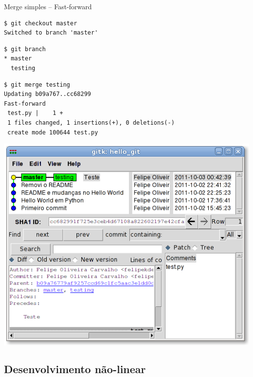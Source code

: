 \documentclass[portuguese,brazil]{beamer}
\begin{document}
\begin{frame}[fragile]{Merge simples -- Fast-forward}
\begin{verbatim}
$ git checkout master
Switched to branch 'master'
\end{verbatim}
\pause
\begin{verbatim}
$ git branch
* master
  testing
\end{verbatim}
\pause
\begin{verbatim}
$ git merge testing
Updating b09a767..cc68299
Fast-forward
 test.py |    1 +
 1 files changed, 1 insertions(+), 0 deletions(-)
 create mode 100644 test.py
\end{verbatim}
\end{frame}

\begin{frame}
\begin{center}
  \includegraphics[scale=0.45]{images/gitkhellogitfastforward.png}
\end{center}
\end{frame}

\subsection{Desenvolvimento não-linear}
\end{document}
